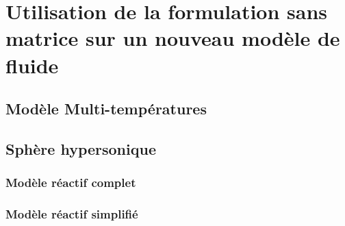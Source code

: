   \section{Utilisation de la formulation sans matrice sur un nouveau modèle de fluide}
    \subsection{Modèle Multi-températures}
    \subsection{Sphère hypersonique}
      \subsubsection{Modèle réactif complet}
      \subsubsection{Modèle réactif simplifié}
